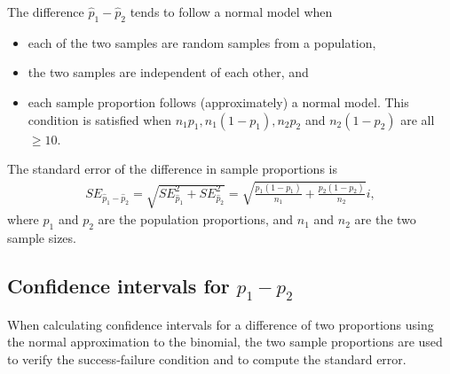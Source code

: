\begin{termBox}{
The difference $\hat{p}_1 - \hat{p}_2$ tends to follow a normal model when
\begin{itemize}
\setlength{\itemsep}{0mm}
\item each of the two samples are random samples from a population,
\item the two samples are independent of each other, and
\item each sample proportion follows (approximately) a normal model. This condition is satisfied when $n_1p_1, n_1(1 - p_1), n_2 p_2$ and $n_2(1 - p_2)$ are all $\geq 10$.
\end{itemize}
The standard error of the difference in sample proportions is
\begin{eqnarray}
SE_{\hat{p}_1 - \hat{p}_2}
	= \sqrt{SE_{\hat{p}_1}^2 + SE_{\hat{p}_2}^2}
	= \sqrt{\frac{p_1(1-p_1)}{n_1} + \frac{p_2(1-p_2)}{n_2}}i,
\label{seForDiffOfProp}
\end{eqnarray}
where $p_1$ and $p_2$ are the population proportions, and $n_1$ and $n_2$ are the two sample sizes.}
\end{termBox}


\subsection{Confidence intervals for $p_1 - p_2$}
\label{confidenceIntervalsDifferenceProportions}

When calculating confidence intervals for a difference of two proportions using the normal approximation to the binomial, the two sample proportions are used to verify the success-failure condition and to compute the standard error.

